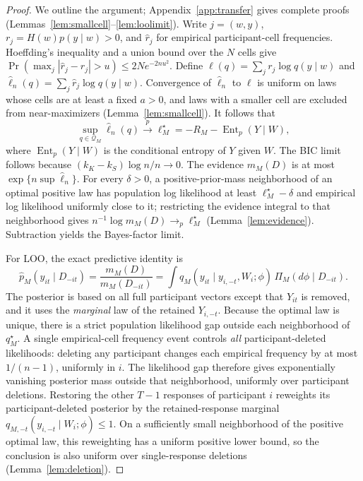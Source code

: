 \documentclass[11pt,letterpaper]{article}
\theoremstyle{plain}
\theoremstyle{definition}
\begin{document}
\begin{proof}
We outline the argument; Appendix~\ref{app:transfer} gives complete proofs (Lemmas~\ref{lem:smallcell}--\ref{lem:loolimit}). Write $j=(w,y)$, $r_j=H(w)p(y\mid w)>0$, and $\hat r_j$ for empirical participant-cell frequencies. Hoeffding's inequality and a union bound over the $N$ cells give $\Pr(\max_j|\hat r_j-r_j|>u)\le2Ne^{-2nu^2}$. Define $\ell(q)=\sum_jr_j\log q(y\mid w)$ and $\hat\ell_n(q)=\sum_j\hat r_j\log q(y\mid w)$. Convergence of $\hat\ell_n$ to $\ell$ is uniform on laws whose cells are at least a fixed $a>0$, and laws with a smaller cell are excluded from near-maximizers (Lemma~\ref{lem:smallcell}). It follows that
\[
\sup_{q\in\mathcal Q_M}\hat\ell_n(q)\xrightarrow{p}\ell_M^\star
=-R_M-\operatorname{Ent}_p(Y\mid W),
\]
where $\operatorname{Ent}_p(Y\mid W)$ is the conditional entropy of $Y$ given $W$. The BIC limit follows because $(k_K-k_S)\log n/n\to0$. The evidence $m_M(D)$ is at most $\exp\{n\sup\hat\ell_n\}$. For every $\delta>0$, a positive-prior-mass neighborhood of an optimal positive law has population log likelihood at least $\ell_M^\star-\delta$ and empirical log likelihood uniformly close to it; restricting the evidence integral to that neighborhood gives $n^{-1}\log m_M(D)\to_p\ell_M^\star$ (Lemma~\ref{lem:evidence}). Subtraction yields the Bayes-factor limit.

For LOO, the exact predictive identity is
\begin{equation}\label{eq:ratio}
\widehat p_M(y_{it}\mid D_{-it})
=\frac{m_M(D)}{m_M(D_{-it})}
=\int q_M(y_{it}\mid y_{i,-t},W_i;\phi)\,\Pi_M(d\phi\mid D_{-it}).
\end{equation}
The posterior is based on all full participant vectors except that $Y_{it}$ is removed, and it uses the \emph{marginal} law of the retained $Y_{i,-t}$. Because the optimal law is unique, there is a strict population likelihood gap outside each neighborhood of $q_M^\star$. A single empirical-cell frequency event controls \emph{all} participant-deleted likelihoods: deleting any participant changes each empirical frequency by at most $1/(n-1)$, uniformly in $i$. The likelihood gap therefore gives exponentially vanishing posterior mass outside that neighborhood, uniformly over participant deletions. Restoring the other $T-1$ responses of participant $i$ reweights its participant-deleted posterior by the retained-response marginal $q_{M,-t}(y_{i,-t}\mid W_i;\phi)\le1$. On a sufficiently small neighborhood of the positive optimal law, this reweighting has a uniform positive lower bound, so the conclusion is also uniform over single-response deletions (Lemma~\ref{lem:deletion}).


\end{proof}
\end{document}

